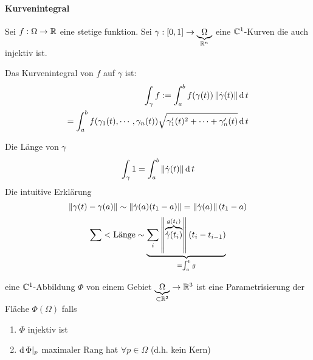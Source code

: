 \paragraph{Kurvenintegral}
Sei $f:\Omega\rightarrow\mathbb{R}$ eine stetige funktion. Sei $\gamma:[0,1]\rightarrow\underbrace{\Omega}_{\mathbb{R}^n}$ eine $\mathbb{C}^1$-Kurven die auch injektiv ist.
\begin{Def}
  Das Kurvenintegral von $f$ auf $\gamma$ ist:
  \begin{eqnarray*}
    \int_\gamma f:=\int_a^b f(\gamma(t))\left\| \dot\gamma(t) \right\|\operatorname{d} t\\
    =\int_a^bf(\gamma_1(t),\cdots,\gamma_n(t))\sqrt{\gamma_1'(t)^2+\cdots+\gamma_n'(t)}\operatorname{d} t
  \end{eqnarray*}
\end{Def}
\begin{Bem}
  Die Länge von $\gamma$
  \[\int_\gamma 1=\int_a^b\left\| \dot\gamma(t) \right\|\operatorname{d} t\]
  Die intuitive Erklärung
  \[\left\| \gamma(t)-\gamma(a) \right\|\sim\left\| \dot\gamma(a)(t_1-a) \right\|=\left\| \dot\gamma(a) \right\|(t_1-a)\]
  \[\sum<\text{Länge}\sim\underbrace{\sum_i\left\| \overbrace{\dot\gamma(t_i)}^{g(t_i)} \right\|(t_i-t_{i-1})}_{=\int_a^b g}\]
\end{Bem}
\begin{Def}
  eine $\mathbb{C}^1$-Abbildung $\Phi$ von einem Gebiet $\underbrace{\Omega}_{\subset\mathbb{R}^2}\rightarrow\mathbb{R}^3$ ist eine Parametrisierung der Fläche $\Phi(\Omega)$ falls
  \begin{enumerate}
    \item $\Phi$ injektiv ist
    \item $\operatorname{d}\Phi|_p$ maximaler Rang hat $\forall p\in \Omega$ (d.h. kein Kern)
  \end{enumerate}
\end{Def}
